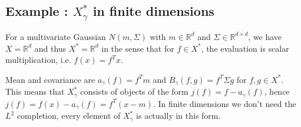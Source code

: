 \documentclass{scrartcl}
\theoremstyle{definition}
\theoremstyle{remark}
\newcommand{\R}{\mathbb R}
\newcommand*\circled[1]{\tikz[baseline=(char.base)]{
            \node[shape=circle,draw,inner sep=2pt] (char) {#1};}}
\DeclareRobustCommand{\myboxtwo}[2][blue!20]{%
\begin{tcolorbox}[   %
        breakable,
        left=0pt,
        right=0pt,
        top=0pt,
        bottom=0pt,
        colback=#1,
        colframe=#1,
        width=\dimexpr\textwidth\relax, 
        enlarge left by=0mm,
        boxsep=5pt,
        arc=10pt,outer arc=10pt,
        ]
        #2
\end{tcolorbox}
}
\begin{document}
\myboxtwo{
\subsection*{Example \circled{1}: $X_\gamma^*$ in finite dimensions}
For a multivariate Gaussian $N(m,\Sigma)$ with $m\in \R^d$ and $\Sigma\in \R^{d\times d}$, we have $X = \R^d$ and thus $X^* = \R^d$ in the sense that for $f\in X^*$, the evaluation is scalar multiplication, i.e. $f(x) = f^T x$.

Mean and covariance are $a_\gamma(f) = f^Tm$ and $B_\gamma(f, g) = f^T\Sigma g$ for $f,g\in X^*$. This means that $X_\gamma^*$ consists of objects of the form $j(f) = f - a_\gamma(f)$, hence $j(f) = f(x) - a_\gamma(f) = f^T(x-m)$. In finite dimensions we don't need the $L^2$ completion, every element of $X_\gamma^*$ is actually in this form. 
}
\end{document}
